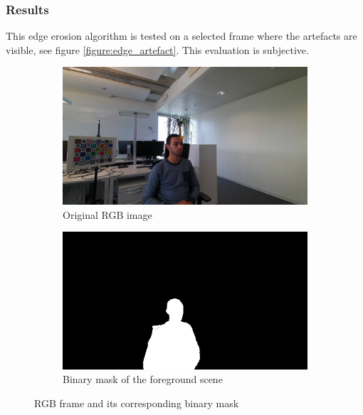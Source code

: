 \subsubsection{Results}

This edge erosion algorithm is tested on a selected frame where the artefacts are visible, see figure \ref{figure:edge_artefact}. This evaluation is subjective.

\begin{figure}[H]
\centering
  \begin{subfigure}[b]{0.48 \textwidth}
    \includegraphics[width=\textwidth]{images/visual_enhancement/edge/sub_00150.jpg}
    \caption{Original RGB image}
    \label{figure:sub_00150_edge}
  \end{subfigure}
  \hfill
  \begin{subfigure}[b]{0.48 \textwidth}
    \includegraphics[width=\textwidth]{images/visual_enhancement/edge/mask_2.png}
    \caption{Binary mask of the foreground scene}
    \label{figure:mask_2}
  \end{subfigure}
  \caption{RGB frame and its corresponding binary mask}
  \label{figure:Chessboard_detection}
\end{figure}

